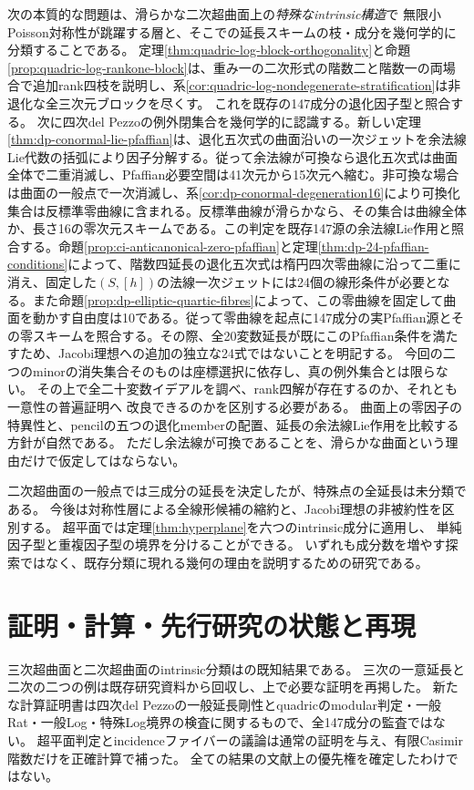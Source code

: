 \documentclass[a4paper,11pt]{ltjsarticle}
\theoremstyle{definition}
\theoremstyle{definition}\newtheorem{definition}[theorem]{定義}
\theoremstyle{remark}\newtheorem{remark}[theorem]{注意}
\begin{document}
次の本質的な問題は、滑らかな二次超曲面上の\emph{特殊なintrinsic構造}で
無限小Poisson対称性が跳躍する層と、そこでの延長スキームの枝・成分を幾何学的に分類することである。
定理\ref{thm:quadric-log-block-orthogonality}と命題\ref{prop:quadric-log-rankone-block}は、重み一の二次形式の階数二と階数一の両場合で追加rank四枝を説明し、系\ref{cor:quadric-log-nondegenerate-stratification}は非退化な全三次元ブロックを尽くす。
これを既存の147成分の退化因子型と照合する。
次に四次del Pezzoの例外閉集合を幾何学的に認識する。新しい定理\ref{thm:dp-conormal-lie-pfaffian}は、退化五次式の曲面沿いの一次ジェットを余法線Lie代数の括弧により因子分解する。従って余法線が可換なら退化五次式は曲面全体で二重消滅し、Pfaffian必要空間は41次元から15次元へ縮む。非可換な場合は曲面の一般点で一次消滅し、系\ref{cor:dp-conormal-degeneration16}により可換化集合は反標準零曲線に含まれる。反標準曲線が滑らかなら、その集合は曲線全体か、長さ16の零次元スキームである。この判定を既存147源の余法線Lie作用と照合する。命題\ref{prop:ci-anticanonical-zero-pfaffian}と定理\ref{thm:dp-24-pfaffian-conditions}によって、階数四延長の退化五次式は楕円四次零曲線に沿って二重に消え、固定した$(S,[h])$の法線一次ジェットには24個の線形条件が必要となる。また命題\ref{prop:dp-elliptic-quartic-fibres}によって、この零曲線を固定して曲面を動かす自由度は10である。従って零曲線を起点に147成分の実Pfaffian源とその零スキームを照合する。その際、全20変数延長が既にこのPfaffian条件を満たすため、Jacobi理想への追加の独立な24式ではないことを明記する。
今回の二つのminorの消失集合そのものは座標選択に依存し、真の例外集合とは限らない。
その上で全二十変数イデアルを調べ、rank四解が存在するのか、それとも一意性の普遍証明へ
改良できるのかを区別する必要がある。
曲面上の零因子の特異性と、pencilの五つの退化memberの配置、延長の余法線Lie作用を比較する方針が自然である。
ただし余法線が可換であることを、滑らかな曲面という理由だけで仮定してはならない。

二次超曲面の一般点では三成分の延長を決定したが、特殊点の全延長は未分類である。
今後は対称性層による全線形候補の縮約と、Jacobi理想の非被約性を区別する。
超平面では定理\ref{thm:hyperplane}を六つのintrinsic成分に適用し、
単純因子型と重複因子型の境界を分けることができる。
いずれも成分数を増やす探索ではなく、既存分類に現れる幾何の理由を説明するための研究である。

\section{証明・計算・先行研究の状態と再現}
三次超曲面と二次超曲面のintrinsic分類は\cite{LPT,May}の既知結果である。
三次の一意延長と二次の二つの例は既存研究資料から回収し、上で必要な証明を再掲した。
新たな計算証明書は四次del Pezzoの一般延長剛性とquadricのmodular判定・一般Rat・一般Log・特殊Log境界の検査に関するもので、全147成分の監査ではない。
超平面判定とincidenceファイバーの議論は通常の証明を与え、有限Casimir階数だけを正確計算で補った。
全ての結果の文献上の優先権を確定したわけではない。
\end{document}
